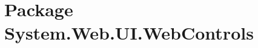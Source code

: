 \section{Package System.Web.UI.Web\-Controls}
\label{namespace_system_1_1_web_1_1_u_i_1_1_web_controls}


